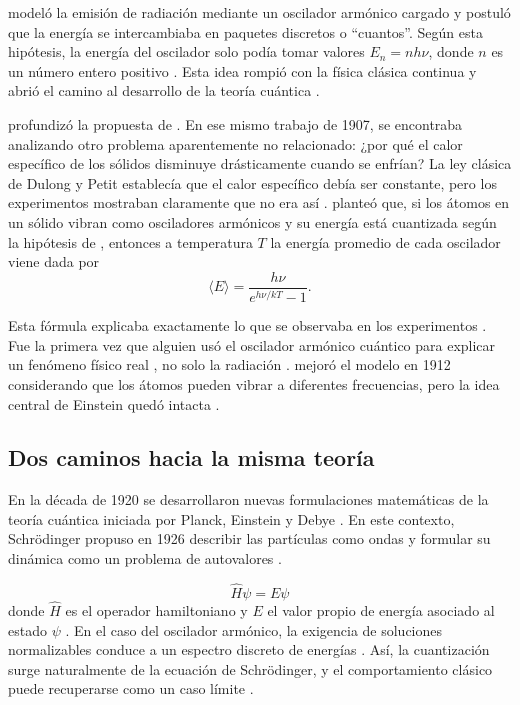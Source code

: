 \cite{planck1901} modeló la emisión de radiación mediante un oscilador armónico cargado y postuló que la energía se intercambiaba en paquetes discretos o ``cuantos''. Según esta hipótesis, la energía del oscilador solo podía tomar valores  $E_n = nh\nu$, donde $n$ es un número entero positivo \citep{planck1900, planck1901}. Esta idea rompió con la física clásica continua y abrió el camino al desarrollo de la teoría cuántica \citep{einstein1907, bornheisenberg1926}.

\cite{einstein1907} profundizó la propuesta de \cite{planck1901}. En ese mismo trabajo de 1907, se encontraba analizando otro problema aparentemente no relacionado: ¿por qué el calor específico de los sólidos disminuye drásticamente cuando se enfrían? La ley clásica de Dulong y Petit \citep{dulong1819} establecía que el calor específico debía ser constante, pero los experimentos mostraban claramente que no era así \citep{dulong1819}. \cite{einstein1907} planteó que, si los átomos en un sólido vibran como osciladores armónicos y su energía está cuantizada según la hipótesis de \cite{planck1901}, entonces a temperatura $T$ la energía promedio de cada oscilador viene dada por
\vspace{-10pt}
\begin{equation}
	\langle E \rangle = \frac{h\nu}{e^{h\nu/kT} - 1}.
\end{equation}

Esta fórmula explicaba exactamente lo que se observaba en los experimentos \citep{einstein1907}. Fue la primera vez que alguien usó el oscilador armónico cuántico para explicar un fenómeno físico real \citep{einstein1907}, no solo la radiación \citep{planck1901}. \citep{debye1912} mejoró el modelo en 1912 considerando que los átomos pueden vibrar a diferentes frecuencias, pero la idea central de Einstein quedó intacta \citep{einstein1907, debye1912}.


\subsection*{Dos caminos hacia la misma teoría}

En la década de 1920 se desarrollaron nuevas formulaciones matemáticas de la teoría cuántica iniciada por Planck, Einstein y Debye \citep{planck1901, einstein1907, debye1912}. En este contexto, Schrödinger propuso en 1926 describir las partículas como ondas y formular su dinámica como un problema de autovalores \citep{schrodinger1926a, schrodinger1926b}.

\vspace{-20pt}
\begin{equation}
	\hat{H}\psi = E\psi
\end{equation}donde $\hat{H}$ es el operador hamiltoniano y $E$ el valor propio de energía asociado al estado $\psi$ \citep{schrodinger1926a, schrodinger1926b}. En el caso del oscilador armónico, la exigencia de soluciones normalizables conduce a un espectro discreto de energías \citep{schrodinger1926a}. Así, la cuantización surge naturalmente de la ecuación de Schrödinger, y el comportamiento clásico puede recuperarse como un caso límite \citep{ehrenfest1927}.


